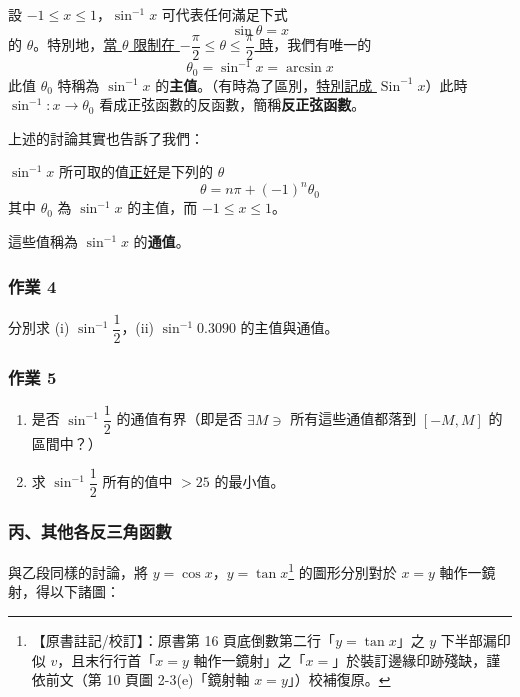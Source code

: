 \medskip
\begin{definition*}
設 $-1 \le x \le 1$，$\sin^{-1} x$ 可代表任何滿足下式
\[
\sin \theta = x
\]
的 $\theta$。特別地，\underline{當 $\theta$ 限制在 $-\dfrac{\pi}{2} \le \theta \le \dfrac{\pi}{2}$ 時}，我們有唯一的
\[
\theta_0 = \sin^{-1} x = \arcsin x
\]
此值 $\theta_0$ 特稱為 $\sin^{-1} x$ 的\textbf{主值}。（有時為了區別，\underline{特別記成 $\operatorname{Sin}^{-1} x$}）此時 $\sin^{-1} : x \longrightarrow \theta_0$ 看成正弦函數的反函數，簡稱\quad \textbf{反正弦函數}。
\end{definition*}

上述的討論其實也告訴了我們：

\medskip
\begin{prop}\label{prop:b5s-1-1}
$\sin^{-1} x$ 所可取的值\underline{正好}是下列的 $\theta$
\[
\theta = n\pi + (-1)^n \theta_0
\]
其中 $\theta_0$ 為 $\sin^{-1} x$ 的主值，而 $-1 \le x \le 1$。
\end{prop}
這些值稱為 $\sin^{-1} x$ 的\textbf{通值}。

\medskip
\subsubsection*{作業 4}
分別求 (i) $\sin^{-1} \dfrac{1}{2}$，(ii) $\sin^{-1} 0.3090$ 的主值與通值。

\medskip
\subsubsection*{作業 5}
\begin{enumerate}[label=(\roman*), topsep=2pt, itemsep=2pt]
  \item 是否 $\sin^{-1} \dfrac{1}{2}$ 的通值有界（即是否 $\exists M \ni$ 所有這些通值都落到 $[-M, M]$ 的區間中？）
  \item 求 $\sin^{-1} \dfrac{1}{2}$ 所有的值中 $> 25$ 的最小值。
\end{enumerate}

\subsubsection*{丙、其他各反三角函數}

與乙段同樣的討論，將 $y = \cos x$，$y = \tan x$\label{note:b5s-ch1-p16bottom}\footnote{【原書註記/校訂】：原書第 16 頁底倒數第二行「$y = \tan x$」之 $y$ 下半部漏印似 $v$，且末行行首「$x = y$ 軸作一鏡射」之「$x =$」於裝訂邊緣印跡殘缺，謹依前文（第 10 頁圖 2-3(e)「鏡射軸 $x = y$」）校補復原。} 的圖形分別對於 $x = y$ 軸作一鏡射，得以下諸圖：

